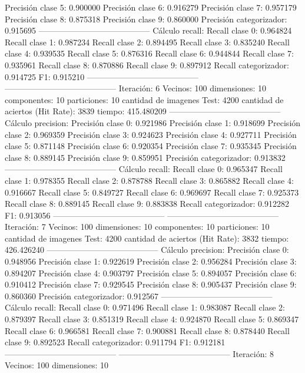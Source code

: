 Precisión clase 5: 0.900000
Precisión clase 6: 0.916279
Precisión clase 7: 0.957179
Precisión clase 8: 0.875318
Precisión clase 9: 0.860000
Precisión categorizador: 0.915695
-----------------------------------------
Cálculo recall: 
Recall clase 0: 0.964824
Recall clase 1: 0.987234
Recall clase 2: 0.894495
Recall clase 3: 0.835240
Recall clase 4: 0.939535
Recall clase 5: 0.876316
Recall clase 6: 0.944844
Recall clase 7: 0.935961
Recall clase 8: 0.870886
Recall clase 9: 0.897912
Recall categorizador: 0.914725
F1: 0.915210
-----------------------------------------
-----------------------------------------
Iteración: 6
Vecinos: 100
dimensiones: 10
componentes: 10
particiones: 10
cantidad de imagenes Test: 4200
cantidad de aciertos (Hit Rate): 3839
tiempo: 415.480209
-----------------------------------------
Cálculo precision: 
Precisión clase 0: 0.921986
Precisión clase 1: 0.918699
Precisión clase 2: 0.969359
Precisión clase 3: 0.924623
Precisión clase 4: 0.927711
Precisión clase 5: 0.871148
Precisión clase 6: 0.920354
Precisión clase 7: 0.935345
Precisión clase 8: 0.889145
Precisión clase 9: 0.859951
Precisión categorizador: 0.913832
-----------------------------------------
Cálculo recall: 
Recall clase 0: 0.965347
Recall clase 1: 0.978355
Recall clase 2: 0.878788
Recall clase 3: 0.865882
Recall clase 4: 0.916667
Recall clase 5: 0.849727
Recall clase 6: 0.969697
Recall clase 7: 0.925373
Recall clase 8: 0.889145
Recall clase 9: 0.883838
Recall categorizador: 0.912282
F1: 0.913056
-----------------------------------------
-----------------------------------------
Iteración: 7
Vecinos: 100
dimensiones: 10
componentes: 10
particiones: 10
cantidad de imagenes Test: 4200
cantidad de aciertos (Hit Rate): 3832
tiempo: 426.426240
-----------------------------------------
Cálculo precision: 
Precisión clase 0: 0.948956
Precisión clase 1: 0.922619
Precisión clase 2: 0.956284
Precisión clase 3: 0.894207
Precisión clase 4: 0.903797
Precisión clase 5: 0.894057
Precisión clase 6: 0.910412
Precisión clase 7: 0.929545
Precisión clase 8: 0.905437
Precisión clase 9: 0.860360
Precisión categorizador: 0.912567
-----------------------------------------
Cálculo recall: 
Recall clase 0: 0.971496
Recall clase 1: 0.983087
Recall clase 2: 0.879397
Recall clase 3: 0.851319
Recall clase 4: 0.924870
Recall clase 5: 0.869347
Recall clase 6: 0.966581
Recall clase 7: 0.900881
Recall clase 8: 0.878440
Recall clase 9: 0.892523
Recall categorizador: 0.911794
F1: 0.912181
-----------------------------------------
-----------------------------------------
Iteración: 8
Vecinos: 100
dimensiones: 10
